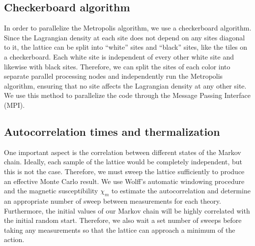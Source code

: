 \documentclass[12pt]{report}
\begin{document}
\subsection{Checkerboard algorithm}

In order to parallelize the Metropolis algorithm, we use a checkerboard algorithm. Since the Lagrangian density at each site does not depend on any sites diagonal to it, the lattice can be split into ``white'' sites and ``black'' sites, like the tiles on a checkerboard. Each white site is independent of every other white site and likewise with black sites. Therefore, we can split the sites of each color into separate parallel processing nodes and independently run the Metropolis algorithm, ensuring that no site affects the Lagrangian density at any other site. We use this method to parallelize the code through the Message Passing Interface (MPI).

\subsection{Autocorrelation times and thermalization}
One important aspect is the correlation between different states of the Markov chain. Ideally, each sample of the lattice would be completely independent, but this is not the case. Therefore, we must sweep the lattice sufficiently to produce an effective Monte Carlo result. We use Wolff's automatic windowing procedure \cite{wolff2007} and the magnetic susceptibility $\chi_m$ to estimate the autocorrelation and determine an appropriate number of sweep between measurements for each theory. Furthermore, the initial values of our Markov chain will be highly correlated with the initial random start. Therefore, we also wait a set number of sweeps before taking any measurements so that the lattice can approach a minimum of the action.
\end{document}
